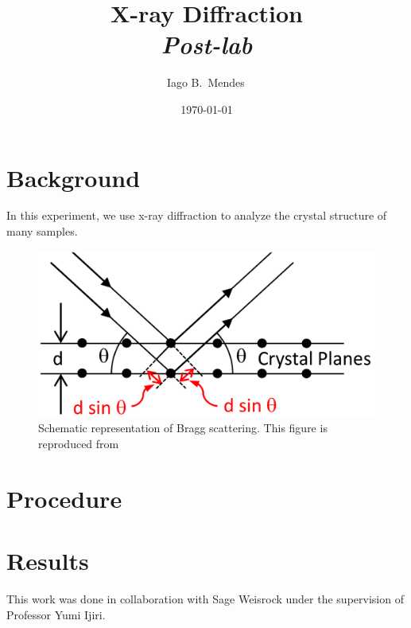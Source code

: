 \documentclass{../paper}
\begin{document}
\title{X-ray Diffraction \\ {\em Post-lab}}

\author{Iago B.~Mendes\,}

\date{\today}

\maketitle

\section{Background}

In this experiment, we use x-ray diffraction to analyze the crystal structure of many samples.

\begin{figure}
  \centering
  \includegraphics[width=0.6\columnwidth]{assets/bragg-scattering.png}
  \caption{Schematic representation of Bragg scattering. This figure is reproduced from \cite{LabManual}}
  \label{fig:angles}
\end{figure}

\section{Procedure}


\section{Results}


\begin{acknowledgements}
  This work was done in collaboration with Sage Weisrock under the supervision of Professor Yumi Ijiri.
\end{acknowledgements}


\end{document}
